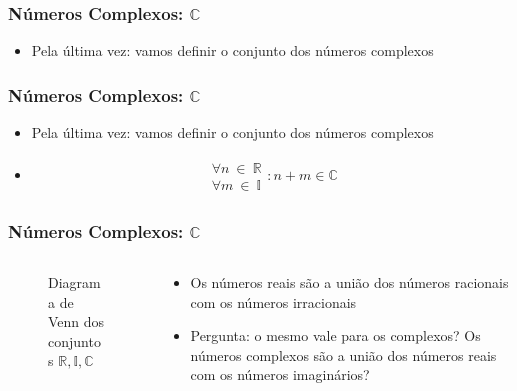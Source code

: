 \documentclass[usenames,dvipsnames,svgnames]{beamer}
\begin{document}
\begin{frame}
	\frametitle{Números Complexos: $\mathbb{C}$}

	\begin{itemize}
		\item Pela última vez: vamos definir o conjunto dos números complexos
	\end{itemize}

\end{frame}

\begin{frame}
	\frametitle{Números Complexos: $\mathbb{C}$}

	\begin{itemize}
		\item Pela última vez: vamos definir o conjunto dos números complexos
		\item
			\begin{equation}
			\begin{aligned}
				\substack{\forall n ~\in~ \mathbb{R} \\ \forall m ~\in~ \mathbb{I}}: n + m \in \mathbb{C}
			\end{aligned}
			\end{equation}
	\end{itemize}

\end{frame}

\begin{frame}
	\frametitle{Números Complexos: $\mathbb{C}$}

	\begin{columns}[t]
	\begin{column}{.6\textwidth}
		\begin{figure}
			\def\Rcircle{		(-1cm,0) circle (0.5cm)}
			\def\Icircle{		(1cm,0) circle (0.5cm)}
			\def\Ccircle{		(0,0) circle (1.75cm)}

			\caption{\small Diagrama de Venn dos conjuntos $\mathbb{R}, \mathbb{I}, \mathbb{C}$}
		\end{figure}
	\end{column}
	\begin{column}{.6\textwidth}
		\begin{itemize}
		\small
		\item Os números reais são a união dos números racionais com os números irracionais
		\item Pergunta: o mesmo vale para os complexos? Os números complexos são a união dos números reais com os números imaginários?
		\end{itemize}
	\end{column}
	\end{columns}

\end{frame}
\end{document}
